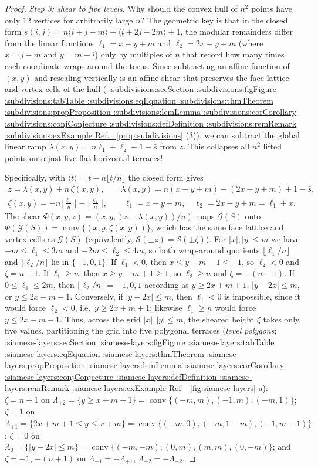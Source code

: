 \documentclass[11pt,a4paper]{article}
\makeatletter
\def\Cref@getprefix#1:#2\relax{#1}
\def\Cref@prefix@sec{sec}
\def\Cref@prefix@fig{fig}
\def\Cref@prefix@tab{tab}
\def\Cref@prefix@eq{eq}
\def\Cref@prefix@thm{thm}
\def\Cref@prefix@prop{prop}
\def\Cref@prefix@lem{lem}
\def\Cref@prefix@cor{cor}
\def\Cref@prefix@conj{conj}
\def\Cref@prefix@def{def}
\def\Cref@prefix@rem{rem}
\def\Cref@prefix@ex{ex}
\def\Cref@type@cap#1{%
  \edef\Cref@tmp{#1}%
  \ifx\Cref@tmp\Cref@prefix@sec Section%
  \else\ifx\Cref@tmp\Cref@prefix@fig Figure%
  \else\ifx\Cref@tmp\Cref@prefix@tab Table%
  \else\ifx\Cref@tmp\Cref@prefix@eq Equation%
  \else\ifx\Cref@tmp\Cref@prefix@thm Theorem%
  \else\ifx\Cref@tmp\Cref@prefix@prop Proposition%
  \else\ifx\Cref@tmp\Cref@prefix@lem Lemma%
  \else\ifx\Cref@tmp\Cref@prefix@cor Corollary%
  \else\ifx\Cref@tmp\Cref@prefix@conj Conjecture%
  \else\ifx\Cref@tmp\Cref@prefix@def Definition%
  \else\ifx\Cref@tmp\Cref@prefix@rem Remark%
  \else\ifx\Cref@tmp\Cref@prefix@ex Example%
  \else Ref.%
  \fi\fi\fi\fi\fi\fi\fi\fi\fi\fi\fi\fi
}
\DeclareRobustCommand{\Cref}[1]{%
  \begingroup
  \edef\Cref@label{#1}%
  \edef\Cref@prefix{\expandafter\Cref@getprefix\Cref@label:\relax}%
  \hyperref[#1]{\Cref@type@cap{\Cref@prefix}~\ref*{#1}}%
  \endgroup
}
\theoremstyle{plain}
\theoremstyle{definition}
\theoremstyle{remark}
\makeatother
\begin{document}
\begin{proof}
\emph{Step 3: shear to five levels.}
Why should the convex hull of $n^2$ points have only $12$ vertices for arbitrarily large $n$? The geometric key is that in the closed form $s(i,j)=n\langle i+j-m\rangle+\langle i+2j-2m\rangle+1$, the modular remainders differ from the linear functions $\ell_1=x-y+m$ and $\ell_2=2x-y+m$ (where $x=j-m$ and $y=m-i$) only by multiples of $n$ that record how many times each coordinate wraps around the torus. Since subtracting an affine function of $(x,y)$ and rescaling vertically is an affine shear that preserves the face lattice and vertex cells of the hull (\Cref{prop:subdivisions}(3)), we can subtract the global linear ramp $\lambda(x,y)=n\ell_1+\ell_2+1-\bar s$ from $z$. This collapses all $n^2$ lifted points onto just five flat horizontal terraces!

Specifically, with $\langle t\rangle=t-n\lfloor t/n\rfloor$ the closed form gives
\begin{gather*}
z=\lambda(x,y)+n\,\zeta(x,y),\qquad \lambda(x,y)=n(x-y+m)+(2x-y+m)+1-\bar s,\\
\zeta(x,y)=-n\Big\lfloor\tfrac{\ell_1}{n}\Big\rfloor-\Big\lfloor\tfrac{\ell_2}{n}\Big\rfloor,\qquad \ell_1=x-y+m,\quad \ell_2=2x-y+m=\ell_1+x .
\end{gather*}
The shear $\Phi(x,y,z)=(x,y,(z-\lambda(x,y))/n)$ maps $\mathcal G(S)$ onto $\Phi(\mathcal G(S))=\operatorname{conv}\{(x,y,\zeta(x,y))\}$, which has the same face lattice and vertex cells as $\mathcal G(S)$ (equivalently, $\mathcal S(\pm z)=\mathcal S(\pm\zeta)$).
For $|x|,|y|\le m$ we have $-m\le\ell_1\le3m$ and $-2m\le\ell_2\le4m$, so both wrap-around quotients $\lfloor\ell_1/n\rfloor$ and $\lfloor\ell_2/n\rfloor$ lie in $\{-1,0,1\}$.
If $\ell_1<0$, then $x\le y-m-1\le-1$, so $\ell_2<0$ and $\zeta=n+1$.
If $\ell_1\ge n$, then $x\ge y+m+1\ge1$, so $\ell_2\ge n$ and $\zeta=-(n+1)$.
If $0\le\ell_1\le2m$, then $\lfloor\ell_2/n\rfloor=-1,0,1$ according as $y\ge2x+m+1$, $|y-2x|\le m$, or $y\le2x-m-1$.
Conversely, if $|y-2x|\le m$, then $\ell_1<0$ is impossible, since it would force $\ell_2<0$, i.e.\ $y\ge2x+m+1$; likewise $\ell_1\ge n$ would force $y\le2x-m-1$.
Thus, across the grid $|x|,|y|\le m$, the sheared height $\zeta$ takes only five values, partitioning the grid into five polygonal terraces (\emph{level polygons}; \Cref{fig:siamese-layers}a):
$\zeta=n+1$ on $\Lambda_{+2}=\{y\ge x+m+1\}=\operatorname{conv}\{(-m,m),(-1,m),(-m,1)\}$;
$\zeta=1$ on $\Lambda_{+1}=\{2x+m+1\le y\le x+m\}=\operatorname{conv}\{(-m,0),(-m,1-m),(-1,m-1)\}$;
$\zeta=0$ on $\Lambda_{0}=\{|y-2x|\le m\}=\operatorname{conv}\{(-m,-m),(0,m),(m,m),(0,-m)\}$;
and $\zeta=-1$, $-(n+1)$ on $\Lambda_{-1}=-\Lambda_{+1}$, $\Lambda_{-2}=-\Lambda_{+2}$.


\end{proof}
\end{document}
